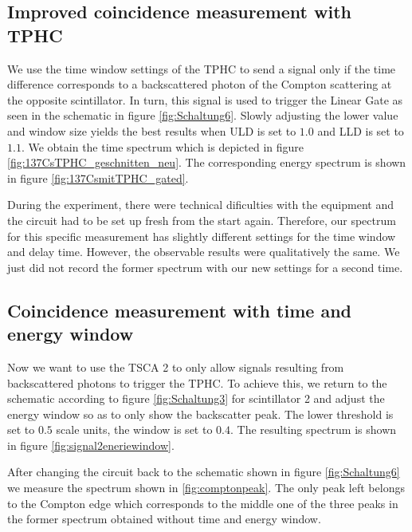 \subsection*{Improved coincidence measurement with TPHC}
%
We use the time window settings of the TPHC to send a signal only if the time difference corresponds to a backscattered photon of the Compton scattering at the opposite scintillator.
In turn, this signal is used to trigger the Linear Gate as seen in the schematic in figure \ref{fig:Schaltung6}.
Slowly adjusting the lower value and window size yields the best results when ULD is set to $1.0$ and LLD is set to $1.1$.
We obtain the time spectrum which is depicted in figure \ref{fig:137CsTPHC_geschnitten_neu}.
The corresponding energy spectrum is shown in figure \ref{fig:137CsmitTPHC_gated}.
%
\par
%
During the experiment, there were technical dificulties with the equipment and the circuit had to be set up fresh from the start again.
Therefore, our spectrum for this specific measurement has slightly different settings for the time window and delay time.
However, the observable results were qualitatively the same.
We just did not record the former spectrum with our new settings for a second time.
%
\subsection*{Coincidence measurement with time and energy window}
%
Now we want to use the TSCA 2 to only allow signals resulting from backscattered photons to trigger the TPHC.
To achieve this, we return to the schematic according to figure \ref{fig:Schaltung3} for scintillator 2 and adjust the energy window so as to only show the backscatter peak.
The lower threshold is set to $0.5$ scale units, the window is set to $0.4$.
The resulting spectrum is shown in figure \ref{fig:signal2eneriewindow}.
%
\par
%
After changing the circuit back to the schematic shown in figure \ref{fig:Schaltung6} we measure the spectrum shown in \ref{fig:comptonpeak}.
The only peak left belongs to the Compton edge which corresponds to the middle one of the three peaks in the former spectrum obtained without time and energy window.
%
